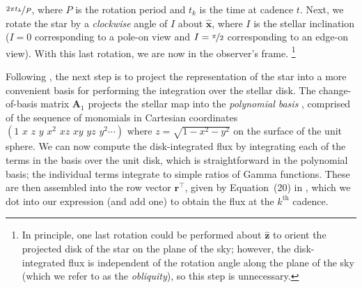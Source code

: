 \documentclass[modern]{aastex62}
\begin{document}
$\nicefrac{2\pi t_k}{P}$, where $P$ is the rotation period and $t_k$ is the
time at cadence $t$.
Next, we rotate the star by a \emph{clockwise} angle of $I$ about $\hat{\mathbf{x}}$,
where $I$ is the stellar inclination ($I = 0$ corresponding to a pole-on view and
$I = \nicefrac{\pi}{2}$ corresponding to an edge-on view). With this last rotation,
we are now in the observer's frame.%
\footnote{In principle, one last rotation could be performed about $\hat{\mathbf{z}}$
    to orient the projected disk of the star on the plane of the sky; however, the disk-integrated
    flux is independent of the rotation angle along the plane of the sky
    (which we refer to as the \emph{obliquity}), so this step is unnecessary.}

Following \citet{Luger2019}, the next step is to project the representation of
the star into a more convenient basis for performing the integration over the stellar
disk. The change-of-basis matrix $\mathbf{A}_1$ \citep[c.f. Appendix~B in][]{Luger2019}
projects the stellar map into the \emph{polynomial basis}
\citep[Equation~7 in][]{Luger2019}, comprised of the sequence of monomials in Cartesian
coordinates
$\left( 1 \,\, x \,\, z \,\, y \,\, x^2 \,\, xz \,\, xy \,\, yz \,\, y^2 \cdots \right)$
where $z = \sqrt{1 - x^2 - y^2}$ on the surface of the unit sphere. We
can now compute the disk-integrated flux by integrating each of the terms in the basis
over the unit disk, which is straightforward in the polynomial basis; the
individual terms integrate to simple ratios of Gamma functions. These are then
assembled into the row vector $\mathbf{r}^\top$, given by Equation~(20) in
\citet{Luger2019}, which we dot into our expression (and add one) to obtain the
flux at the $k^\mathrm{th}$ cadence.
\end{document}
